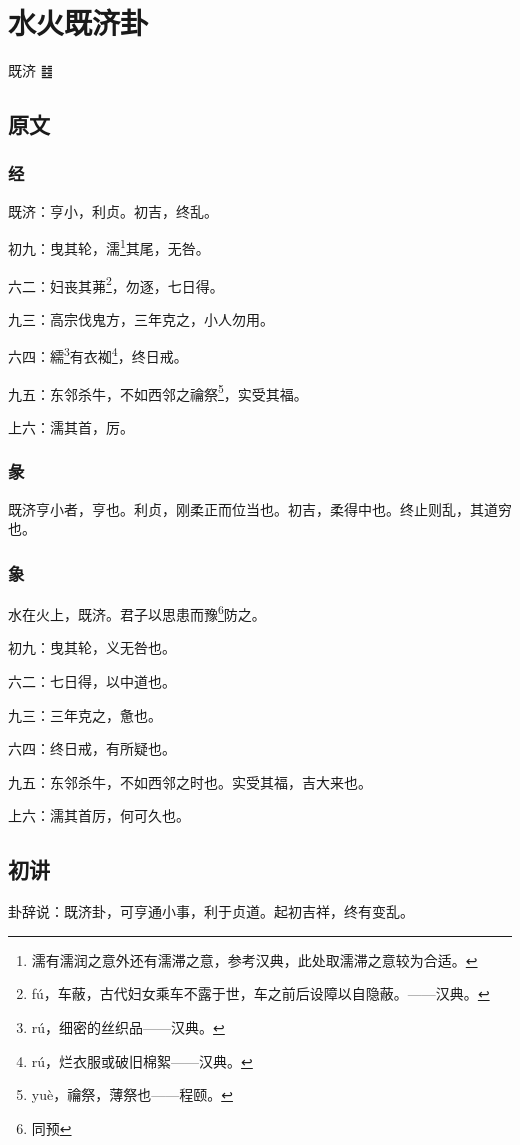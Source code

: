 \documentclass[12pt,oneside]{book}
\begin{document}
\chapter{水火既济卦}
既济 {\Large ䷾}

\section{原文}

\subsection{经}
既济：亨小，利贞。初吉，终乱。

初九：曳其轮，濡\footnote{濡有濡润之意外还有濡滞之意，参考汉典，此处取濡滞之意较为合适。}其尾，无咎。

六二：妇丧其茀\footnote{fú，车蔽，古代妇女乘车不露于世，车之前后设障以自隐蔽。——汉典。}，勿逐，七日得。

九三：高宗伐鬼方，三年克之，小人勿用。

六四：繻\footnote{rú，细密的丝织品——汉典。}有衣袽\footnote{rú，烂衣服或破旧棉絮——汉典。}，终日戒。

九五：东邻杀牛，不如西邻之禴祭\footnote{yuè，禴祭，薄祭也——程颐。}，实受其福。

上六：濡其首，厉。

\subsection{彖}
既济亨小者，亨也。利贞，刚柔正而位当也。初吉，柔得中也。终止则乱，其道穷也。

\subsection{象}
水在火上，既济。君子以思患而豫\footnote{同预}防之。

初九：曳其轮，义无咎也。

六二：七日得，以中道也。

九三：三年克之，惫也。

六四：终日戒，有所疑也。

九五：东邻杀牛，不如西邻之时也。实受其福，吉大来也。

上六：濡其首厉，何可久也。

\section{初讲}
卦辞说：既济卦，可亨通小事，利于贞道。起初吉祥，终有变乱。
\end{document}
